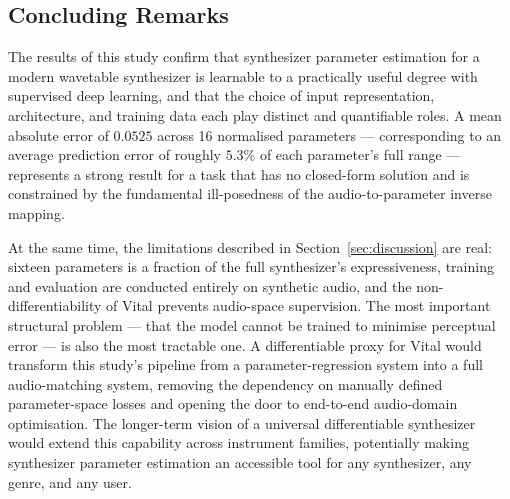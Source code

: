 \subsection{Concluding Remarks}

\noindent
The results of this study confirm that synthesizer parameter estimation for a modern wavetable synthesizer is learnable to a practically useful degree with supervised deep learning, and that the choice of input representation, architecture, and training data each play distinct and quantifiable roles. A mean absolute error of $0.0525$ across 16 normalised parameters — corresponding to an average prediction error of roughly $5.3\%$ of each parameter's full range — represents a strong result for a task that has no closed-form solution and is constrained by the fundamental ill-posedness of the audio-to-parameter inverse mapping.

\noindent \newline
At the same time, the limitations described in Section~\ref{sec:discussion} are real: sixteen parameters is a fraction of the full synthesizer's expressiveness, training and evaluation are conducted entirely on synthetic audio, and the non-differentiability of Vital prevents audio-space supervision. The most important structural problem — that the model cannot be trained to minimise perceptual error — is also the most tractable one. A differentiable proxy for Vital would transform this study's pipeline from a parameter-regression system into a full audio-matching system, removing the dependency on manually defined parameter-space losses and opening the door to end-to-end audio-domain optimisation. The longer-term vision of a universal differentiable synthesizer would extend this capability across instrument families, potentially making synthesizer parameter estimation an accessible tool for any synthesizer, any genre, and any user.
